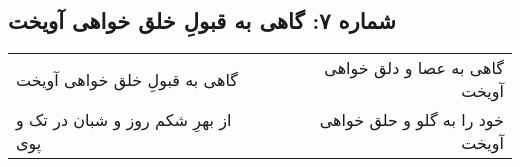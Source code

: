 \begin{center}
\section*{شماره ۷: گاهی به قبولِ خلق خواهی آویخت}
\label{sec:007}
\begin{longtable}{l p{0.5cm} r}
گاهی به قبولِ خلق خواهی آویخت
&&
گاهی به عصا و دلق خواهی آویخت
\\
از بهرِ شکم روز و شبان در تک و پوی
&&
خود را به گلو و حلق خواهی آویخت
\\
\end{longtable}
\end{center}
